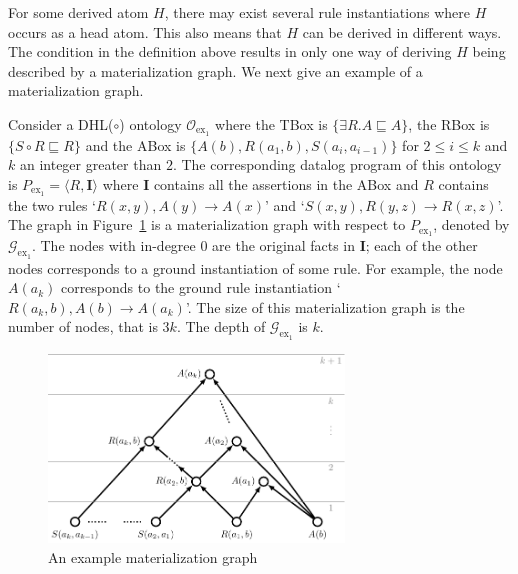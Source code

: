 For some derived atom $H$, there may exist several rule instantiations where $H$
occurs as a head atom.
This also means that $H$ can be derived in different ways.
The condition in the definition above results in only one way of deriving $H$ being
described by a materialization graph.
We next give an example of a materialization graph.\\

\begin{example}\label{exp:mg}
Consider a DHL($\circ$) ontology $\mathcal{O}_{\text{ex}_1}$ where the TBox is
$\{\exists R.A\sqsubseteq A\}$, the RBox is $\{S\circ R\sqsubseteq R\}$ and
the ABox is $\{A(b),R(a_1,b),S(a_i,a_{i-1})\}$ for $2\leq i\leq k$ and
$k$ an integer greater than $2$.
The corresponding datalog program of this ontology is $P_{\text{ex}_1}=\langle R, \textbf{I}\rangle$
where $\textbf{I}$ contains all the assertions in the ABox
and $R$ contains the two rules `$R(x,y),A(y)\rightarrow A(x)$'
and `$S(x,y),R(y,z)\rightarrow R(x,z)$'.
The graph in Figure~\ref{fig:mg} is a materialization graph with respect to $P_{\text{ex}_1}$,
denoted by $\mathcal{G}_{\text{ex}_1}$.
The nodes with in-degree 0 are the original facts in $\textbf{I}$;
each of the other nodes corresponds to a ground instantiation of some rule.
For example, the node $A(a_k)$ corresponds to the ground rule instantiation
`$R(a_k,b),A(b)\rightarrow A(a_k)$'.
The size of this materialization graph is the number of nodes, that is $3k$.
The depth of $\mathcal{G}_{\text{ex}_1}$ is $k$.
\end{example}

\begin{figure}[htbp]
\begin{center}
\includegraphics[width=0.7\textwidth]{fig-mg.pdf}
\caption{An example materialization graph}
\label{fig:mg}
\end{center}
\end{figure}

